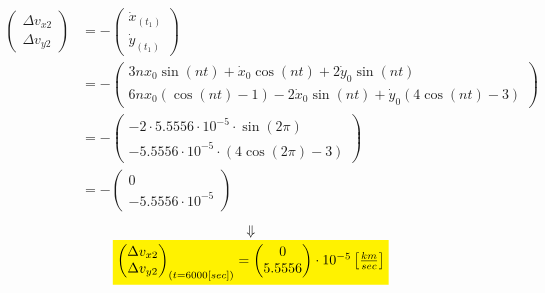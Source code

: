 \documentclass[11pt, a4paper]{article}
\begin{document}
\begin{align}
    \begin{pmatrix}
        \Delta v_{x2} \\ \Delta v_{y2}
    \end{pmatrix} &= -\begin{pmatrix}
        \dot{x}_{(t_1)}\\\dot{y}_{(t_1)}
    \end{pmatrix} \\
    &= - \begin{pmatrix}
        3nx_0\sin(nt) + \dot{x}_0\cos(nt) +2\dot{y}_0\sin(nt) \\ 6nx_0\left(\cos(nt)-1\right) -2\dot{x}_0\sin(nt) + \dot{y}_0\left(4\cos(nt)-3\right) 
    \end{pmatrix} \\
    &= - \begin{pmatrix}
        -2\cdot5.5556\cdot10^{-5}\cdot\sin(2\pi) \\
        -5.5556\cdot10^{-5}\cdot\left(4\cos(2\pi)-3\right) 
    \end{pmatrix} \\
    &= - \begin{pmatrix}
        0 \\
        -5.5556\cdot10^{-5}
    \end{pmatrix}
\end{align}
\begin{equation*}
    \begin{array}{c}
        \Downarrow\\
        \colorbox{yellow}{$ \begin{pmatrix}
            \Delta v_{x2} \\ \Delta v_{y2}
        \end{pmatrix}_{(t=6000[sec])} = \begin{pmatrix}
            0 \\ 5.5556
        \end{pmatrix}\cdot10^{-5}\left[\frac{km}{sec}\right]$}
    \end{array}
\end{equation*}
\end{document}
